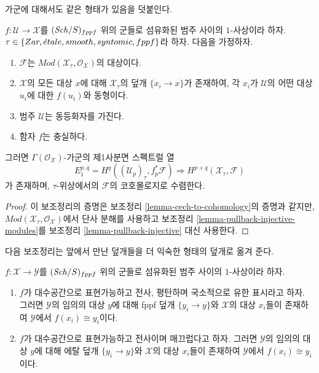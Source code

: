 \noindent
가군에 대해서도 같은 형태가 있음을 덧붙인다.

\begin{lemma}
\label{lemma-cech-to-cohomology-modules}
$f : \mathcal{U} \to \mathcal{X}$를 $(\mathit{Sch}/S)_{fppf}$ 위의
군들로 섬유화된 범주 사이의 $1$-사상이라 하자.
$\tau \in \{Zar, {\acute{e}tale}, smooth, syntomic, fppf\}$라 하자.
다음을 가정하자.
\begin{enumerate}
\item $\mathcal{F}$는
$\textit{Mod}(\mathcal{X}_\tau, \mathcal{O}_\mathcal{X})$의 대상이다.
\item $\mathcal{X}$의 모든 대상 $x$에 대해
$\mathcal{X}_\tau$의 덮개 $\{x_i \to x\}$가 존재하여,
각 $x_i$가 $\mathcal{U}$의 어떤 대상 $u_i$에 대한
$f(u_i)$와 동형이다.
\item 범주 $\mathcal{U}$는 동등화자를 가진다.
\item 함자 $f$는 충실하다.
\end{enumerate}
그러면 $\Gamma(\mathcal{O}_\mathcal{X})$-가군의 제1사분면
스펙트럴 열
$$
E_1^{p, q} = H^q((\mathcal{U}_p)_\tau, f_p^*\mathcal{F})
\Rightarrow
H^{p + q}(\mathcal{X}_\tau, \mathcal{F})
$$
가 존재하며, $\tau$-위상에서의 $\mathcal{F}$의 코호몰로지로 수렴한다.
\end{lemma}

\begin{proof}
이 보조정리의 증명은 보조정리 \ref{lemma-cech-to-cohomology}의
증명과 같지만, $\textit{Mod}(\mathcal{X}_\tau, \mathcal{O}_\mathcal{X})$에서
단사 분해를 사용하고 보조정리 \ref{lemma-pullback-injective-modules}를
보조정리 \ref{lemma-pullback-injective} 대신 사용한다.
\end{proof}

\noindent
다음 보조정리는 앞에서 만난 덮개들을 더 익숙한 형태의 덮개로
옮겨 준다.

\begin{lemma}
\label{lemma-surjective-flat-locally-finite-presentation}
$f : \mathcal{X} \to \mathcal{Y}$를 $(\mathit{Sch}/S)_{fppf}$ 위의
군들로 섬유화된 범주 사이의 $1$-사상이라 하자.
\begin{enumerate}
\item $f$가 대수공간으로 표현가능하고 전사, 평탄하며 국소적으로
유한 표시라고 하자. 그러면 $\mathcal{Y}$의 임의의 대상 $y$에 대해
fppf 덮개 $\{y_i \to y\}$와 $\mathcal{X}$의 대상 $x_i$들이 존재하여
$\mathcal{Y}$에서 $f(x_i) \cong y_i$이다.
\item $f$가 대수공간으로 표현가능하고 전사이며 매끄럽다고 하자.
그러면 $\mathcal{Y}$의 임의의 대상 $y$에 대해 에탈 덮개
$\{y_i \to y\}$와 $\mathcal{X}$의 대상 $x_i$들이 존재하여
$\mathcal{Y}$에서 $f(x_i) \cong y_i$이다.
\end{enumerate}
\end{lemma}

